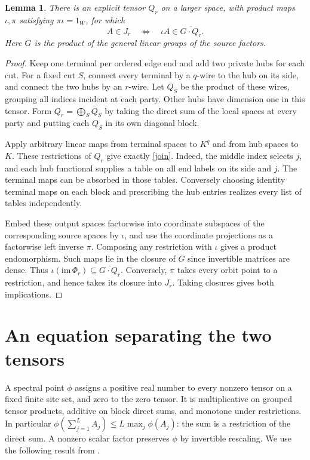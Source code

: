 \documentclass[11pt,letterpaper]{article}
\newtheorem{lemma}[theorem]{Lemma}
\begin{document}
\begin{lemma}\label{orbit}
There is an explicit tensor $Q_r$ on a larger space, with product maps
$\iota,\pi$ satisfying $\pi\iota=1_W$, for which
\[
                 A\in J_r\quad\Longleftrightarrow\quad
                 \iota A\in\overline{G\cdot Q_r}.
\]
Here $G$ is the product of the general linear groups of the source factors.
\end{lemma}
\begin{proof}
Keep one terminal per ordered edge end and add two private hubs for each
cut. For a fixed cut $S$, connect every terminal by a $q$-wire to the hub
on its side, and connect the two hubs by an $r$-wire. Let $Q_S$ be the
product of these wires, grouping all indices incident at each party.
Other hubs have dimension one in this tensor. Form $Q_r=\bigoplus_S Q_S$
by taking the direct sum of the local spaces at every party and putting
each $Q_S$ in its own diagonal block.

Apply arbitrary linear maps from terminal spaces to $K^q$ and from
hub spaces to $K$. These restrictions of $Q_r$ give exactly
\eqref{join}. Indeed, the middle index selects $j$, and each hub
functional supplies a table on all end labels on its side and $j$.
The terminal maps can be absorbed in those tables. Conversely choosing
identity terminal maps on each block and prescribing the hub entries
realizes every list of tables independently.

Embed these output spaces factorwise into coordinate subspaces of the
corresponding source spaces by $\iota$, and use the coordinate
projections as a factorwise left inverse $\pi$.
Composing any restriction with $\iota$ gives a product endomorphism.
Such maps lie in the closure of $G$ since invertible matrices are dense.
Thus $\iota(\mathrm{im}\,\Phi_r)\subseteq\overline{G\cdot Q_r}$.
Conversely, $\pi$ takes every orbit point to a restriction, and hence
takes its closure into $J_r$. Taking closures gives both implications.
\end{proof}

\section{An equation separating the two tensors}
A spectral point $\phi$ assigns a positive real number to every nonzero
tensor on a fixed finite site set, and zero to the zero tensor. It is
multiplicative on grouped tensor products, additive on block direct sums,
and monotone under restrictions. In particular
$\phi(\sum_{j=1}^L A_j)\le L\max_j\phi(A_j)$: the sum is a restriction
of the direct sum. A nonzero scalar factor preserves $\phi$ by invertible
rescaling. We use the following result from \cite{euclid}.
\end{document}

